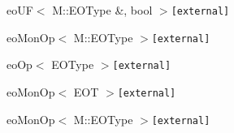 \begin{CompactList}
\begin{CompactList}
\item eo\-UF$<$ M::EOType \&, bool $>${\tt  [external]}\begin{CompactList}
\item eo\-Mon\-Op$<$ M::EOType $>${\tt  [external]}\end{CompactList}
\end{CompactList}
\item eo\-Op$<$ EOType $>${\tt  [external]}\begin{CompactList}
\item eo\-Mon\-Op$<$ EOT $>${\tt  [external]}\item eo\-Mon\-Op$<$ M::EOType $>${\tt  [external]}\end{CompactList}
\item {}
\item {}
\item {}
\item {}
\end{CompactList}
